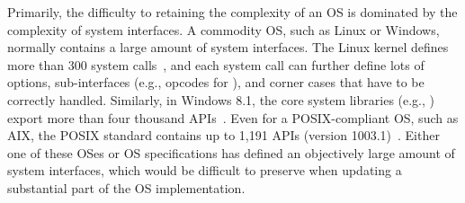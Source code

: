Primarily, the difficulty to retaining the complexity of an OS
is dominated by the complexity of system interfaces.
A commodity OS, such as Linux or Windows, normally contains a large amount of system interfaces. %
The Linux kernel defines more than 300 system calls~\cite{linux-man-syscall}, and each system call
can further define lots of options, sub-interfaces (e.g., opcodes for ), and corner cases that have to be correctly handled.
Similarly, in Windows 8.1, the core system libraries (e.g., ) export more than four thousand APIs~\cite{win-api}.
Even for a POSIX-compliant OS, such as AIX, the POSIX standard contains up to 1,191 APIs (version 1003.1)~\cite{ieee-posix}. %
Either one of these OSes or OS specifications has defined an objectively large amount of system interfaces, which would be difficult to preserve when updating a substantial part of the OS implementation.








